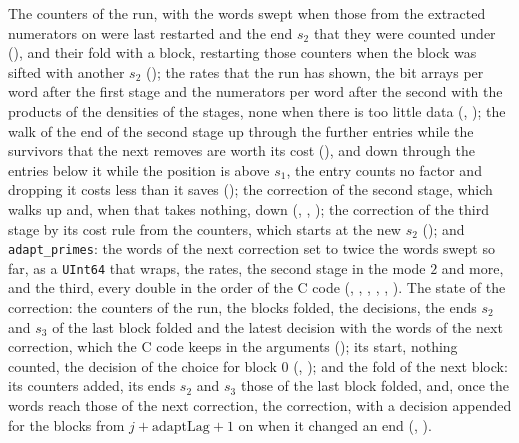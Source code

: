 \begin{definition}\label{def:correction}
  \leanok
  The counters of the run, with the words swept when those from the extracted numerators on were
  last restarted and the end $s_2$ that they were counted under
  (), and their fold with a block, restarting those counters when
  the block was sifted with another $s_2$ (); the rates that the
  run has shown, the bit arrays per word after the first stage and the numerators per word after the
  second with the products of the densities of the stages, none when there is too little data
  (, ); the walk of the end of
  the second stage up through the further entries while the survivors that the next removes are
  worth its cost (), and down through the entries below it while
  the position is above $s_1$, the entry counts no factor and dropping it costs less than it saves
  (); the correction of the second stage, which walks up and,
  when that takes nothing, down (,
  , ); the correction of the
  third stage by its cost rule from the counters, which starts at the new $s_2$
  (); and \verb|adapt_primes|: the words of the next correction
  set to twice the words swept so far, as a \verb|UInt64| that wraps, the rates, the second stage in
  the mode $2$ and more, and the third, every double in the order of the C code
  (, ,
  , ,
  , ). The state of the
  correction: the counters of the run, the blocks folded, the decisions, the ends $s_2$ and $s_3$ of
  the last block folded and the latest decision with the words of the next correction, which the C
  code keeps in the arguments (); its start, nothing counted, the
  decision of the choice for block $0$ (,
  ); and the fold of the next block: its counters added, its ends
  $s_2$ and $s_3$ those of the last block folded, and, once the words reach those of the next
  correction, the correction, with a decision appended for the blocks from
  $j + \mathrm{adaptLag} + 1$ on when it changed an end (,
  ).
\end{definition}

